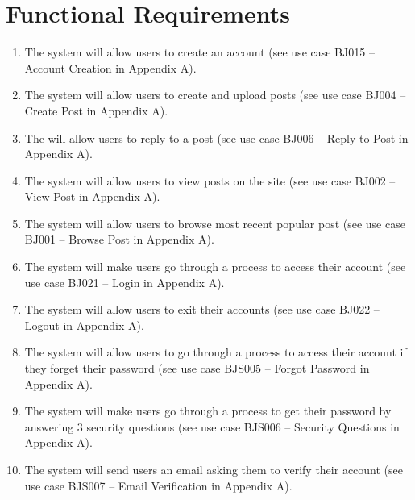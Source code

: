 \documentclass{report}
\begin{document}
\section{Functional Requirements}
\begin{enumerate}
    \item The system will allow users to create an account (see use case BJ015 – Account Creation in Appendix A).
    \item The system will allow users to create and upload posts (see use case BJ004 – Create Post in Appendix A).
    \item The will allow users to reply to a post (see use case BJ006 – Reply to Post in Appendix A).
    \item The system will allow users to view posts on the site (see use case BJ002 – View Post in Appendix A).
    \item The system will allow users to browse most recent popular post (see use case BJ001 – Browse Post in Appendix A).
    \item The system will make users go through a process to access their account (see use case BJ021 – Login in Appendix A).
    \item The system will allow users to exit their accounts (see use case BJ022 – Logout in Appendix A).
    \item The system will allow users to go through a process to access their account if they forget their password (see use case BJS005 – Forgot Password in Appendix A).
    \item The system will make users go through a process to get their password by answering 3 security questions (see use case BJS006 – Security Questions in Appendix A).
    \item The system will send users an email asking them to verify their account (see use case BJS007 – Email Verification in Appendix A).
\end{enumerate}
\end{document}
